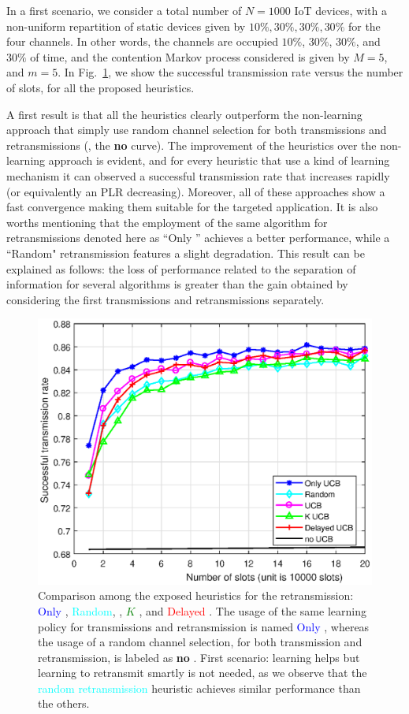 In a first scenario, we consider a total number of $N=1000$ IoT devices, with a non-uniform repartition of static devices given by $10\%,30\%,30\%,30\%$ for the four channels.
In other words, the channels are occupied $10\%$, $30\%$, $30\%$, and $30\%$ of time, and the contention Markov process considered is given by $M = 5$, and $m=5$.
In Fig.~\ref{fig:43:mainExperiment1}, we show the successful transmission rate versus the number of slots, for all the proposed heuristics.

A first result is that all the heuristics clearly outperform the non-learning approach that simply use random channel selection for both transmissions and retransmissions (\ie, the \textbf{no \UCB{}} curve).
The improvement of the heuristics over the non-learning approach is evident, and for every heuristic that use a kind of learning mechanism it can observed a successful transmission rate that increases rapidly (or equivalently an PLR decreasing).
Moreover, all of these approaches show a fast convergence making them suitable for the targeted application.
It is also worths mentioning that the employment of the same \UCB{} algorithm for retransmissions denoted here as ``Only \UCB{}'' achieves a better performance, while a ``Random" retransmission features a slight degradation. This result can be explained as follows: the loss of performance related to the separation of information for several algorithms is greater than the gain obtained by considering the first transmissions and retransmissions separately.

\begin{figure}[h!]  %
	\centering
	\includegraphics[width=0.75\linewidth]{ResultsUCB.eps}
	\caption[Test of a shorter caption]{
		Comparison among the exposed heuristics for the retransmission: \textcolor{blue}{Only \UCB}, \textcolor{cyan}{Random}, \textcolor{purple}{\UCB}, \textcolor{green}{$K$ \UCB}, and \textcolor{red}{Delayed \UCB}.
		The usage of the same learning policy for transmissions and retransmission is named \textcolor{blue}{Only \UCB{}},
		whereas the usage of a random channel selection, for both transmission and retransmission, is labeled as \textbf{no \UCB{}}.
		First scenario: learning helps but learning to retransmit smartly is not needed, as we observe that the \textcolor{cyan}{random retransmission} heuristic achieves similar performance than the others.
	}
	\label{fig:43:mainExperiment1}
\end{figure}

